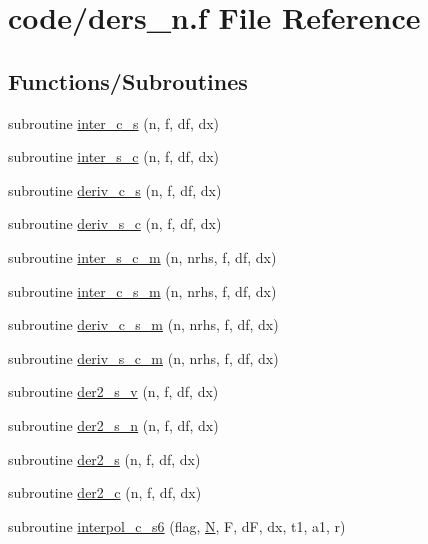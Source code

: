 \hypertarget{ders__n_8f}{}\section{code/ders\+\_\+n.f File Reference}
\label{ders__n_8f}
\subsection*{Functions/\+Subroutines}
\begin{DoxyCompactItemize}
\item 
subroutine \hyperlink{ders__n_8f_a428bd77eb265e83b885a22d7ba669be2}{inter\+\_\+c\+\_\+s} (n, f, df, dx)
\item 
subroutine \hyperlink{ders__n_8f_a4c4552fce10338ca444460ee9e458397}{inter\+\_\+s\+\_\+c} (n, f, df, dx)
\item 
subroutine \hyperlink{ders__n_8f_ac8fae2c25978db11f5a3504bf29b8757}{deriv\+\_\+c\+\_\+s} (n, f, df, dx)
\item 
subroutine \hyperlink{ders__n_8f_a03bb68342c381937ad1ffc828a0f3b2e}{deriv\+\_\+s\+\_\+c} (n, f, df, dx)
\item 
subroutine \hyperlink{ders__n_8f_a9c66063fe97fdebd7c87c36cdd652c25}{inter\+\_\+s\+\_\+c\+\_\+m} (n, nrhs, f, df, dx)
\item 
subroutine \hyperlink{ders__n_8f_a8db7315af1304ec4ca272240cd16739b}{inter\+\_\+c\+\_\+s\+\_\+m} (n, nrhs, f, df, dx)
\item 
subroutine \hyperlink{ders__n_8f_a193158e4b0763802315cc3ec6c85b58b}{deriv\+\_\+c\+\_\+s\+\_\+m} (n, nrhs, f, df, dx)
\item 
subroutine \hyperlink{ders__n_8f_a2e4d9d718762935497b9d458cc02f4f9}{deriv\+\_\+s\+\_\+c\+\_\+m} (n, nrhs, f, df, dx)
\item 
subroutine \hyperlink{ders__n_8f_a31ff8b26a5357b1b52ae71e4f7106a3b}{der2\+\_\+s\+\_\+v} (n, f, df, dx)
\item 
subroutine \hyperlink{ders__n_8f_ac9979f83add01ba34e1e3a3aa9d1c688}{der2\+\_\+s\+\_\+n} (n, f, df, dx)
\item 
subroutine \hyperlink{ders__n_8f_a4e34fb09ff930f5b2a193bbfe2cc449b}{der2\+\_\+s} (n, f, df, dx)
\item 
subroutine \hyperlink{ders__n_8f_a6ab3dfe06be2475da5f66b58d9dabd52}{der2\+\_\+c} (n, f, df, dx)
\item 
subroutine \hyperlink{ders__n_8f_af0bd629e206c5e562d08607f3c475144}{interpol\+\_\+c\+\_\+s6} (flag, \hyperlink{mc__gpu_8cu_ab2b6b0c222cd1ce70d6a831f57241e59}{N}, F, dF, dx, t1, a1, r)

\end{DoxyCompactItemize}
